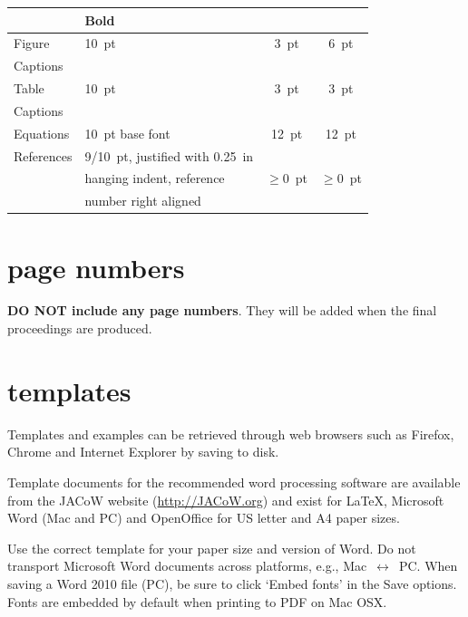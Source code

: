 \documentclass[a4paper,
              ]{jacow}
\begin{document}
\begin{table}[h!t]
\begin{tabular}{@{}llcc@{}}
                       & Bold                        &                 &      \\
        \midrule
         Figure        & \SI{10}{pt}                 & \SI{3}{pt}           & \SI{6}{pt}  \\
         Captions      &                             &                 &      \\
        \midrule
         Table         & \SI{10}{pt}                      & \SI{3}{pt}           & \SI{3}{pt}  \\
         Captions      &                             &                 &      \\
        \midrule
         Equations     & \SI{10}{pt} base font            & \SI{12}{pt}          & \SI{12}{pt} \\
        \midrule
         References    & \SI{9/10}{pt}, justified with  \SI{0.25}{in} &      &  \\
                       & hanging indent, reference   & $\ge$\SI{0}{pt} & $\ge$\SI{0}{pt}  \\
                       & number right aligned     &                 &        \\
        \bottomrule
    \end{tabular}
\end{table}

\section{page numbers}

\textbf{DO NOT include any page numbers}. They will be added
when the final proceedings are produced.

\section{templates}

Templates and examples can be retrieved through web
browsers such as Firefox, Chrome and Internet Explorer by saving to disk.

Template documents for the recommended word processing software are
available from the JACoW website (\url{http://JACoW.org}) and exist for
\LaTeX, Microsoft Word (Mac and PC) and OpenOffice for US letter and A4 paper sizes.

Use the correct template for your paper size and version of Word.
Do not transport Microsoft Word documents across platforms, e.g.,
Mac~$\leftrightarrow$~PC. When saving a Word 2010 file (PC), be sure
to click `Embed fonts' in the Save options. Fonts are embedded by default
when printing to PDF on Mac OSX.
\end{document}
